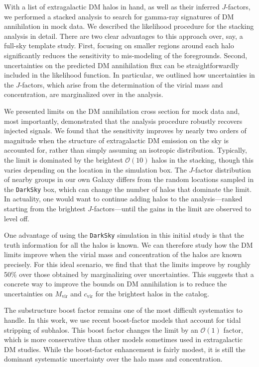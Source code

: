 With a list of extragalactic DM halos in hand, as well as their inferred $J$-factors, we performed a stacked analysis to search for gamma-ray signatures of DM annihilation in mock data.  We described the likelihood procedure for the stacking analysis in detail.  There are two clear advantages to this approach over, say,  a full-sky template study.%
First, focusing on smaller regions around each halo significantly reduces the sensitivity to mis-modeling of the foregrounds.  Second, uncertainties on the predicted DM annihilation flux can be straightforwardly included in the likelihood function.  In particular, we outlined how uncertainties in the $J$-factors, which arise from the determination of the virial mass and concentration, are marginalized over in the analysis. 

We presented limits on the DM annihilation cross section for mock data and, most importantly, demonstrated that the analysis procedure robustly recovers injected signals.  We found that the sensitivity improves by nearly two orders of magnitude when the structure of extragalactic DM emission on the sky is accounted for, rather than simply assuming an isotropic distribution.  Typically, the limit is dominated by the brightest $\mathcal{O}(10)$ halos in the stacking, though this varies depending on the location in the simulation box.  The $J$-factor distribution of nearby groups in our own Galaxy differs from the random locations sampled in the \texttt{DarkSky} box, which can change the number of halos that dominate the limit.  In actuality, one would want to continue adding halos to the analysis---ranked starting from the brightest $J$-factors---until the gains in the limit are observed to level off.

One advantage of using the \texttt{DarkSky} simulation in this initial study is that the truth information for all the halos is known.  We can therefore study how the DM limits improve when the virial mass and  concentration of the halos are known precisely.  For this ideal scenario, we find that that the limits improve by roughly 50\% over those obtained by marginalizing over uncertainties.  This suggests that a concrete way to improve the bounds on DM annihilation is to reduce the uncertainties on $M_\text{vir}$ and $c_\text{vir}$ for the brightest halos in the catalog.

The substructure boost factor remains one of the most difficult systematics to handle.  In this work, we use recent boost-factor models that account for tidal stripping of subhalos.  This boost factor changes the limit by an $\mathcal{O}(1)$ factor, which is more conservative than other models sometimes used in extragalactic DM studies.  While the boost-factor enhancement is fairly modest, it is still the dominant systematic uncertainty over the halo mass and  concentration.   

